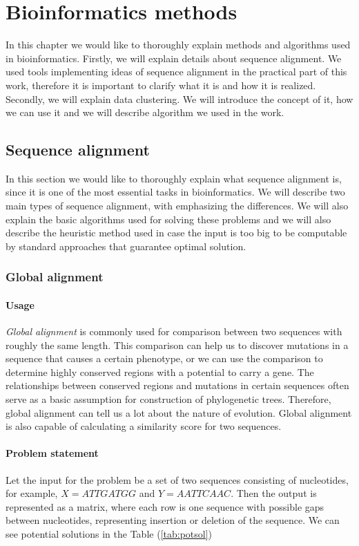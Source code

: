 \chapter{Bioinformatics methods}
In this chapter we would like to thoroughly explain methods and algorithms used in bioinformatics.
Firstly, we will explain details about sequence alignment.
We used tools implementing ideas of sequence alignment in the practical part of this work, therefore it is important to clarify what it is and how it is realized.
Secondly, we will explain data clustering.
We will introduce the concept of it, how we can use it and we will describe algorithm we used in the work.
  
\section{Sequence alignment}
In this section we would like to thoroughly explain what sequence alignment is, since it is one of the most essential tasks in bioinformatics.
We will describe two main types of sequence alignment, with emphasizing the differences.
We will also explain the basic algorithms used for solving these problems and we will also describe the heuristic method used in case the input is too big to be computable by standard approaches that guarantee optimal solution.

\subsection{Global alignment}
\subsubsection{Usage}
\emph{Global alignment} is commonly used for comparison between two sequences with roughly the same length.
This comparison can help us to discover mutations in a sequence that causes a certain phenotype, or we can use the comparison to determine highly conserved regions with a potential to carry a gene.
The relationships between conserved regions and mutations in certain sequences often serve as a basic assumption for construction of phylogenetic trees.
Therefore, global alignment can tell us a lot about the nature of evolution.
Global alignment is also capable of calculating a similarity score for two sequences.

\subsubsection{Problem statement}
Let the input for the problem be a set of two sequences consisting of nucleotides, for example, $ X = ATTGATGG $ and $ Y = AATTCAAC $.
Then the output is represented as a matrix, where each row is one sequence with possible gaps between nucleotides, representing insertion or deletion of the sequence.
We can see potential solutions in the Table (\ref{tab:potsol})

